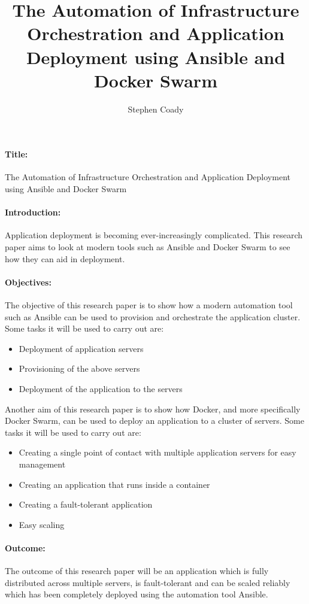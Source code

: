 \documentclass{article}
\author{Stephen Coady}
\title{The Automation of Infrastructure Orchestration and Application Deployment using Ansible and Docker Swarm}
\begin{document}
\maketitle
\thispagestyle{empty}
\newpage

\paragraph{Title:} 
\label{par:Title}
The Automation of Infrastructure Orchestration and Application Deployment using Ansible and Docker Swarm

\paragraph{Introduction:} 
\label{par:Introduction}
Application deployment is becoming ever-increasingly complicated. This research paper aims to look at modern tools such as Ansible and Docker Swarm to see how they can aid in deployment. 

\paragraph{Objectives:}
\label{par:Objectives}
The objective of this research paper is to show how a modern automation tool such as Ansible can be used to provision and orchestrate the application cluster. \newline
\newline
Some tasks it will be used to carry out are: 

\begin{itemize}
	\item Deployment of application servers
	\item Provisioning of the above servers
	\item Deployment of the application to the servers
\end{itemize}
\newline
Another aim of this research paper is to show how Docker, and more specifically Docker Swarm, can be used to deploy an application to a cluster of servers.
\newline
\newline
Some tasks it will be used to carry out are:

\begin{itemize}
	\item Creating a single point of contact with multiple application servers for easy management
	\item Creating an application that runs inside a container
	\item Creating a fault-tolerant application
	\item Easy scaling
\end{itemize}

\paragraph{Outcome:}
\label{par:Outcome}
The outcome of this research paper will be an application which is fully distributed across multiple servers, is fault-tolerant and can be scaled reliably which has been completely deployed using the automation tool Ansible.
\end{document}
